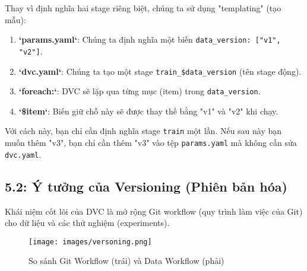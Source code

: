 \documentclass[11pt]{article}
\begin{document}
Thay vì định nghĩa hai stage riêng biệt, chúng ta sử dụng "templating" (tạo mẫu):
\begin{enumerate}
    \item \textbf{`params.yaml`}: Chúng ta định nghĩa một biến \texttt{data\_version: ["v1", "v2"]}.
    \item \textbf{`dvc.yaml`}: Chúng ta tạo một stage \texttt{train\_\${data\_version}} (tên stage động).
    \item \textbf{`foreach:`}: DVC sẽ lặp qua từng mục (item) trong \texttt{data\_version}.
    \item \textbf{`\${item}`}: Biến giữ chỗ này sẽ được thay thế bằng "v1" và "v2" khi chạy.
\end{enumerate}
Với cách này, bạn chỉ cần định nghĩa stage \texttt{train} một lần. Nếu sau này bạn muốn thêm "v3", bạn chỉ cần thêm "v3" vào tệp \texttt{params.yaml} mà không cần sửa \texttt{dvc.yaml}.

\subsection{5.2: Ý tưởng của Versioning (Phiên bản hóa)}
Khái niệm cốt lõi của DVC là mở rộng Git workflow (quy trình làm việc của Git) cho dữ liệu và các thử nghiệm (experiments).

\begin{figure}[H]
    \centering
    \texttt{[image: images/versoning.png]}
    \caption{So sánh Git Workflow (trái) và Data Workflow (phải)}
\end{figure}
\end{document}
